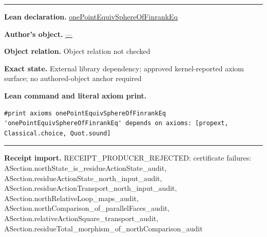 \documentclass[11pt]{article}
\theoremstyle{plain}
\theoremstyle{definition}
\theoremstyle{remark}
\begin{document}
\begin{tcolorbox}
\begin{Verbatim}[breaklines=true,breakanywhere=true,fontsize=\small]
\end{Verbatim}
\medskip\hrule\medskip
\textbf{Lean declaration.} \url{onePointEquivSphereOfFinrankEq}
\par\textbf{Author's object.} \url{—}
\par\textbf{Object relation.} Object relation not checked
\par\textbf{Exact state.} External library dependency; approved kernel-reported axiom surface; no authored-object anchor required
\par\smallskip\textbf{Lean command and literal axiom print.}
\begin{Verbatim}[breaklines=true,breakanywhere=true,fontsize=\small]
#print axioms onePointEquivSphereOfFinrankEq
'onePointEquivSphereOfFinrankEq' depends on axioms: [propext, Classical.choice, Quot.sound]
\end{Verbatim}
\medskip\hrule\medskip
\textbf{Receipt import.} \textcolor{KgtRed}{RECEIPT\_PRODUCER\_REJECTED: certificate failures: ASection.northState\_is\_residueActionState\_audit, ASection.residueActionState\_north\_input\_audit, ASection.residueActionTransport\_north\_input\_audit, ASection.northRelativeLoop\_maps\_audit, ASection.northComparison\_of\_parallelFaces\_audit, ASection.relativeActionSquare\_transport\_audit, ASection.residueTotal\_morphism\_of\_northComparison\_audit}
\end{tcolorbox}
\medskip
\end{document}
